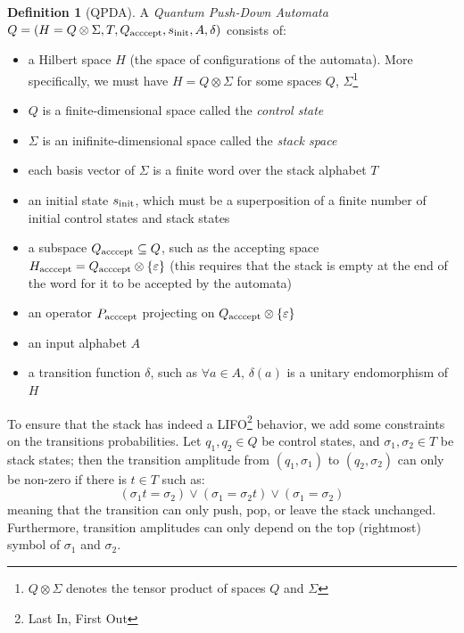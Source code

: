 \documentclass[12pt,a4paper]{article}
\theoremstyle{plain}
\theoremstyle{definition}
\newtheorem*{definition}{Definition}
\begin{document}
\begin{definition}[QPDA]
    A \emph{Quantum Push-Down Automata} $Q=(H=Q\otimes \Sigma, T, Q_{\textnormal{acccept}}, s_{\textnormal{init}}, A, \delta)$ consists of:
    \begin{itemize}[label=--, noitemsep]
        \item a Hilbert space $H$ (the space of configurations of the automata). More specifically, we must have $H=Q\otimes \Sigma$ for some spaces $Q$, $\Sigma$\footnote{$Q\otimes \Sigma$ denotes the tensor product of spaces $Q$ and $\Sigma$}
        \item $Q$ is a finite-dimensional space called the \emph{control state}
        \item $\Sigma$ is an inifinite-dimensional space called the \emph{stack space}
        \item each basis vector of $\Sigma$ is a finite word over the stack alphabet $T$
        \item an initial state $s_{\textnormal{init}}$, which must be a superposition of a finite number of initial control states and stack states
        \item a subspace $Q_{\textnormal{acccept}} \subseteq Q$, such as the accepting space $H_{\textnormal{acccept}}=Q_{\textnormal{acccept}}\otimes \{\varepsilon\}$ (this requires that the stack is empty at the end of the word for it to be accepted by the automata)
        \item an operator $P_{\textnormal{acccept}}$ projecting on $Q_{\textnormal{acccept}}\otimes \{\varepsilon\}$
        \item an input alphabet $A$
        \item a transition function $\delta$, such as $\forall a\in A$, $\delta(a)$ is a unitary endomorphism of $H$
    \end{itemize}

    To ensure that the stack has indeed a LIFO\footnote{Last In, First Out} behavior, we add some constraints on the transitions probabilities. Let $q_1, q_2\in Q$ be control states, and $\sigma_1, \sigma_2\in T$ be stack states; then the transition amplitude from $(q_1, \sigma_1)$ to $(q_2, \sigma_2)$ can only be non-zero if there is $t\in T$ such as:
    \begin{equation*}
        (\sigma_1t = \sigma_2) \lor (\sigma_1 = \sigma_2t) \lor (\sigma_1 = \sigma_2)
    \end{equation*}
    meaning that the transition can only push, pop, or leave the stack unchanged. Furthermore, transition amplitudes can only depend on the top (rightmost) symbol of $\sigma_1$ and $\sigma_2$.
\end{definition}
\end{document}
